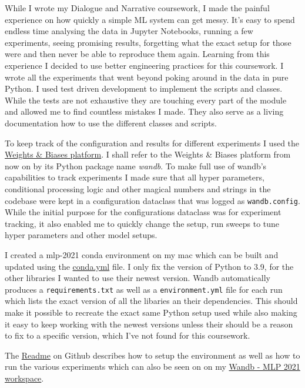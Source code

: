 \documentclass[a4paper]{article}
\begin{document}
    While I wrote my Dialogue and Narrative coursework, I made the painful experience on how quickly a
    simple ML system can get messy. It's
    easy to spend endless time analysing the data in Jupyter Notebooks, running a few experiments, seeing promising results,
    forgetting what the exact setup for those were and then never be able to reproduce them again. Learning from this
    experience I decided to use better engineering practices for this coursework. I wrote all the experiments that went
    beyond poking around in the data in pure Python. I used test
    driven development to implement the scripts and classes. While the tests are not exhaustive they are touching every
    part of the module and allowed me to find countless mistakes I made. They also serve as a living
    documentation how to use the different classes and scripts.

    To keep track of the configuration and results for different experiments I used the
    \href{https://wandb.ai/site}{Weights \& Biases platform}\cite{wandb}.
    I shall refer to the Weights \& Biases platform from now on by its Python package name \textit{wandb}. To make full
    use of wandb's capabilities to track experiments I made sure that all hyper parameters,
    conditional processing logic and other magical numbers and strings in the codebase were kept in a configuration
    dataclass that was logged as \texttt{wandb.config}. While the initial purpose for the configurations dataclass was for experiment
    tracking, it also enabled me to quickly change the setup, run sweeps to tune hyper parameters and other model setups.

    I created a mlp-2021 conda environment \cite{conda-forge} on my mac which can be built and updated using the
    \href{https://github.com/isabelladegen/mlp-2021/blob/main/conda.yml}{conda.yml} file. I only fix the version of Python to 3.9,
    for the other libraries I wanted to use their newest version. Wandb automatically produces a \texttt{requirements.txt}
    as well as a \texttt{environment.yml} file for each run which lists the exact version of all the libaries an their
    dependencies. This should make it possible to recreate the exact same Python setup used while also making it easy to keep working with
    the newest versions unless their should be a reason to fix to a specific version, which I've not found for this coursework.

    The \href{https://github.com/isabelladegen/mlp-2021}{Readme} on Github describes how to setup the environment as well
    as how to run the various experiments which can also be seen on on my \href{https://wandb.ai/idegen/mlp-2021}{Wandb - MLP 2021 workspace}.
\end{document}
